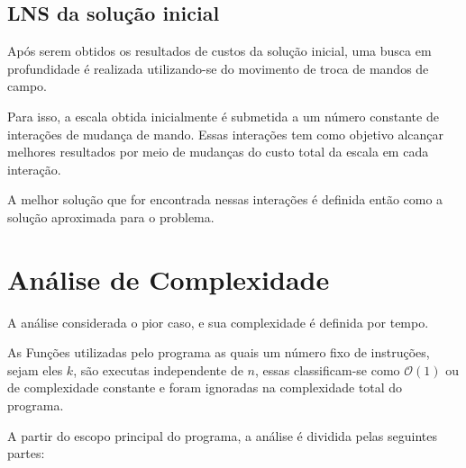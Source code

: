 \documentclass[12pt,a4paper]{article}
\numberwithin{figure}{section}
\numberwithin{table}{section}
\begin{document}
\subsection{LNS da solução inicial}

Após serem obtidos os resultados de custos da solução inicial, uma busca em profundidade é realizada utilizando-se do movimento de troca de mandos de campo. 

Para isso, a escala obtida inicialmente é submetida a um número constante de interações de mudança de mando. Essas interações tem como objetivo alcançar melhores resultados por meio de mudanças do custo total da escala em cada interação.

A melhor solução que for encontrada nessas interações é definida então como a solução aproximada para o problema.

\section{Análise de Complexidade}

A análise considerada o pior caso, e sua complexidade é definida por tempo.

As Funções utilizadas pelo programa as quais um número fixo de instruções, sejam eles $k$, são executas independente de $n$, essas classificam-se como $\mathcal{O}(1)$ ou de complexidade constante e foram ignoradas na complexidade total do programa.

A partir do escopo principal do programa, a análise é dividida pelas seguintes partes:
\end{document}
